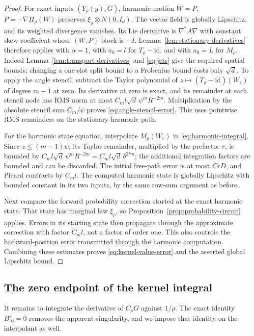 \begin{proof}
For exact inputs $(Y_\rho(y),G)$, harmonic motion
$\dot W=P$, $\dot P=-\nabla H_\rho(W)$ preserves
$\xi_\rho\otimes N(0,I_d)$.  The vector field is globally Lipschitz,
and its weighted divergence vanishes.  Its Lie derivative is
$\nabla^*A\nabla$ with constant skew coefficient whose $(W,P)$ block
is $-I$.  Lemma~\ref{lem:stationary-derivatives} therefore applies with
$\alpha=1$, with $a_0=l$ for $T_\rho-\mathrm{id}$, and with $a_0=L$
for $M_\rho$.  Indeed Lemma~\ref{lem:transport-derivatives} and
\eqref{eq:jets} give the required spatial bounds; changing a one-slot
split bound to a Frobenius bound costs only $\sqrt d$.
To apply the angle stencil, subtract the Taylor polynomial of
$z\mapsto(T_\rho-\mathrm{id})(W_z)$ of degree $m-1$ at zero.
Its derivative at zero is exact, and its remainder at each stencil
node has RMS norm at most $C_ml\sqrt d\,\psi^mR^{-2m}$.
Multiplication by the absolute stencil sum $C_m/\psi$ proves
\eqref{eq:angle-stencil-error}.  This uses pointwise RMS
remainders on the stationary harmonic path.

For the harmonic state equation, interpolate $M_\rho(W_v)$ in
\eqref{eq:harmonic-integral}.  Since $z\le(m-1)\psi$, its Taylor
remainder, multiplied by the prefactor $r$, is bounded by
$C_ml\sqrt d\,\psi^mR^{-2m}
=C_ml\sqrt d\,\delta^{2tm}$; the additional integration factors are
bounded and can be discarded.  The initial free-path error is at most
$CrD$, and Picard contracts by $C_ml$.  The computed harmonic state is
globally Lipschitz with bounded constant in its two inputs, by the same
row-sum argument as before.

Next compare the forward probability correction started at the exact
harmonic state.  That state has marginal law $\xi_\rho$, so
Proposition~\ref{prop:probability-circuit} applies.  Errors in its
starting state then propagate through the approximate correction with
factor $C_ml$, not a factor of order one.  This also controls the
backward-position error transmitted through the harmonic computation.
Combining these estimates proves \eqref{eq:kernel-value-error} and
the asserted global Lipschitz bound.
\end{proof}

\subsection{The zero endpoint of the kernel integral}

It remains to integrate the derivative of $C_\rho G$ against $1/\rho$.
The exact identity $B'_0=0$ removes the apparent singularity, and we
impose that identity on the interpolant as well.

